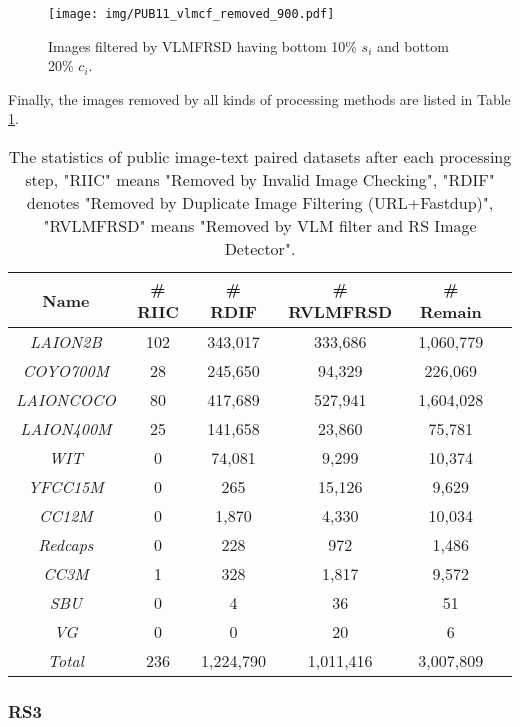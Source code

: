 \documentclass[journal]{IEEEtran}
\begin{document}
\begin{figure}[htbp]
    \centering
    \texttt{[image: img/PUB11\_vlmcf\_removed\_900.pdf]}
    \caption{Images filtered by VLMFRSD having bottom 10\% $s_i$ and bottom 20\% $c_i$.}
    \label{fig:pub11_vlmcf_removed_900}
\end{figure}



Finally, the images removed by all kinds of processing methods are listed in Table \ref{table:pubdataset_step_stat}.

\begin{table}[H]
\caption{The statistics of public image-text paired datasets after each processing step, "RIIC" means "Removed by Invalid Image Checking", "RDIF" denotes "Removed by Duplicate Image Filtering (URL+Fastdup)", "RVLMFRSD" means "Removed by VLM filter and RS Image Detector".}
\label{table:pubdataset_step_stat}
\centering {} 
\begin{tabular}{|c|c|c|c|c|c|}\hline
Name & \# RIIC & \# RDIF  & \# RVLMFRSD & \# Remain \\\hline
\textit{LAION2B} & 102 & 343,017 & 333,686 & 1,060,779\\
\textit{COYO700M} & 28 & 245,650& 94,329  & 226,069 \\
\textit{LAIONCOCO} & 80 & 417,689& 527,941 & 1,604,028  \\
\textit{LAION400M} & 25 & 141,658 & 23,860 & 75,781 \\
\textit{WIT} & 0 & 74,081 & 9,299 & 10,374  \\
\textit{YFCC15M} & 0 & 265 & 15,126 & 9,629\\
\textit{CC12M} & 0 & 1,870 & 4,330 & 10,034\\
\textit{Redcaps} & 0 & 228 & 972 & 1,486\\
\textit{CC3M} & 1 & 328 & 1,817 & 9,572\\
\textit{SBU} & 0 & 4 & 36 & 51 \\
\textit{VG} & 0 & 0 & 20 & 6\\
\textit{Total} & 236 & 1,224,790 & 1,011,416 & 3,007,809 \\ \hline
\end{tabular}
\end{table}




\subsubsection{RS3}
\label{appendix:RS3}
\end{document}

